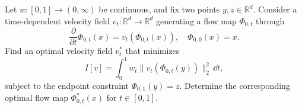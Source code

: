 \documentclass[12pt,a4paper,oneside]{book}
\begin{document}
\begin{example}
\label{ex:weightedaction}\label{src:p9q6}

\begin{Question}
Let $w:[0,1]\to(0,\infty)$ be continuous, and fix two points $y,z\in\mathbb{R}^d$. Consider a time-dependent velocity field
$v_t:\mathbb{R}^d\to\mathbb{R}^d$ generating a flow map $\Phi_{0,t}$ through
\begin{equation*}
    \frac{\partial}{\partial t}\Phi_{0,t}(x) = v_t(\Phi_{0,t}(x)), \quad
    \Phi_{0,0}(x)=x.
\end{equation*}
Find an optimal velocity field $v_t^*$ that minimizes
\begin{equation*}
    I[v]=\int_0^1 w_t\|v_t(\Phi_{0,t}(y))\|_2^2\,\dd t,
\end{equation*}
subject to the endpoint constraint $\Phi_{0,1}(y)=z$. Determine the corresponding optimal flow map $\Phi_{0,t}^*(x)$ for
$t\in[0,1]$.
\end{Question}


\end{example}
\end{document}
